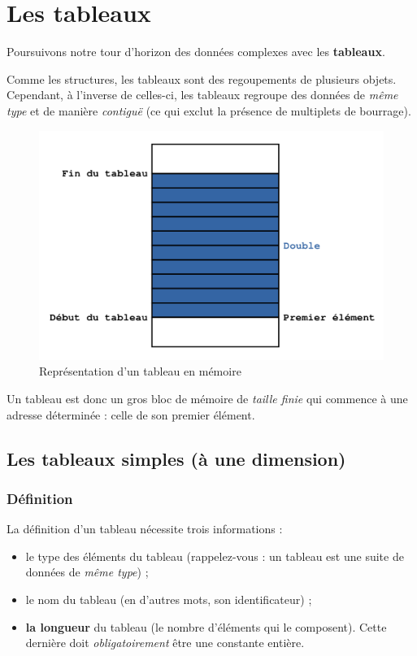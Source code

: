 \chapter{Les tableaux}
\label{les-tableaux}

Poursuivons notre tour d'horizon des données complexes avec
les \textbf{tableaux}.

Comme les structures, les tableaux sont des regoupements de plusieurs
objets. Cependant, à l'inverse de celles-ci, les tableaux regroupe des
données de \emph{même type} et de manière \emph{contiguë} (ce qui exclut
la présence de multiplets de bourrage).

\begin{figure}[htbp]
\centering
\includegraphics[scale=0.5]{images/tableau_memoire.png}
\caption{Représentation d'un tableau en mémoire}
\end{figure}

Un tableau est donc un gros bloc de mémoire de \emph{taille finie} qui
commence à une adresse déterminée : celle de son premier élément.

\section{Les tableaux simples (à une dimension)}
\label{les-tableaux-simples-(a-une-dimension}

\subsection{Définition}
\label{definition-1}

La définition d'un tableau nécessite trois informations :

\begin{itemize}
\item
  le type des éléments du tableau (rappelez-vous : un tableau est une
  suite de données de \emph{même type}) ;\\
\item
  le nom du tableau (en d'autres mots, son identificateur) ;\\
\item
  \textbf{la longueur} du tableau (le nombre d'éléments qui le
  composent). Cette dernière doit \emph{obligatoirement} être une
  constante entière.
\end{itemize}

